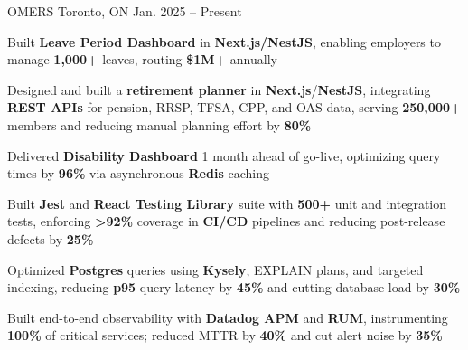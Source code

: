 \documentclass[11pt, a4paper]{awesome-cv}
\begin{document}
\makecvheader[C]


\begin{cventries}


  \cventry
    {\color{lightblue}{ASSOCIATE FULL-STACK ENGINEER}}
    {OMERS}
    {Toronto, ON}
    {Jan. 2025 -- Present}
    {
      \begin{cvitems}
        \item{Built \textbf{Leave Period Dashboard} in \textbf{Next.js/NestJS}, enabling employers to manage \textbf{1,000+} leaves, routing \textbf{\$1M+} annually}
        \item{Designed and built a \textbf{retirement planner} in \textbf{Next.js}/\textbf{NestJS}, integrating \textbf{REST APIs} for pension, RRSP, TFSA, CPP, and OAS data, serving \textbf{250,000+} members and reducing manual planning effort by \textbf{80\%}}
        \item{Delivered \textbf{Disability Dashboard} 1 month ahead of go-live, optimizing query times by \textbf{96\%} via asynchronous \textbf{Redis} caching}
        \item{Built \textbf{Jest} and \textbf{React Testing Library} suite with \textbf{500+} unit and integration tests, enforcing \textbf{>92\%} coverage in \textbf{CI/CD} pipelines and reducing post-release defects by \textbf{25\%}}
        \item{Optimized \textbf{Postgres} queries using \textbf{Kysely}, EXPLAIN plans, and targeted indexing, reducing \textbf{p95} query latency by \textbf{45\%} and cutting database load by \textbf{30\%}}
        \item{Built end-to-end observability with \textbf{Datadog APM} and \textbf{RUM}, instrumenting \textbf{100\%} of critical services; reduced MTTR by \textbf{40\%} and cut alert noise by \textbf{35\%}}
      \end{cvitems}
    }

  \vspace{3mm}


\end{cventries}
\end{document}
